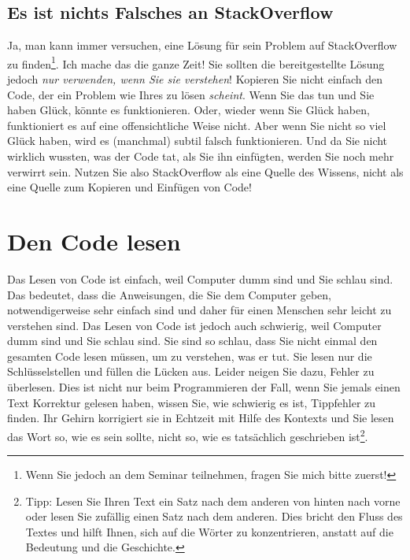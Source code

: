 \documentclass[
]{book}
\begin{document}
\hypertarget{es-ist-nichts-falsches-an-stackoverflow}{%
\subsection{Es ist nichts Falsches an StackOverflow}\label{es-ist-nichts-falsches-an-stackoverflow}}

Ja, man kann immer versuchen, eine Lösung für sein Problem auf StackOverflow zu finden\footnote{Wenn Sie jedoch an dem Seminar teilnehmen, fragen Sie mich bitte zuerst!}. Ich mache das die ganze Zeit! Sie sollten die bereitgestellte Lösung jedoch \emph{nur verwenden, wenn Sie sie verstehen}! Kopieren Sie nicht einfach den Code, der ein Problem wie Ihres zu lösen \emph{scheint}. Wenn Sie das tun und Sie haben Glück, könnte es funktionieren. Oder, wieder wenn Sie Glück haben, funktioniert es auf eine offensichtliche Weise nicht. Aber wenn Sie nicht so viel Glück haben, wird es (manchmal) subtil falsch funktionieren. Und da Sie nicht wirklich wussten, was der Code tat, als Sie ihn einfügten, werden Sie noch mehr verwirrt sein. Nutzen Sie also StackOverflow als eine Quelle des Wissens, nicht als eine Quelle zum Kopieren und Einfügen von Code!

\hypertarget{reading-tips}{%
\section{Den Code lesen}\label{reading-tips}}

Das Lesen von Code ist einfach, weil Computer dumm sind und Sie schlau sind. Das bedeutet, dass die Anweisungen, die Sie dem Computer geben, notwendigerweise sehr einfach sind und daher für einen Menschen sehr leicht zu verstehen sind. Das Lesen von Code ist jedoch auch schwierig, weil Computer dumm sind und Sie schlau sind. Sie sind so schlau, dass Sie nicht einmal den gesamten Code lesen müssen, um zu verstehen, was er tut. Sie lesen nur die Schlüsselstellen und füllen die Lücken aus. Leider neigen Sie dazu, Fehler zu überlesen. Dies ist nicht nur beim Programmieren der Fall, wenn Sie jemals einen Text Korrektur gelesen haben, wissen Sie, wie schwierig es ist, Tippfehler zu finden. Ihr Gehirn korrigiert sie in Echtzeit mit Hilfe des Kontexts und Sie lesen das Wort so, wie es sein sollte, nicht so, wie es tatsächlich geschrieben ist\footnote{Tipp: Lesen Sie Ihren Text ein Satz nach dem anderen von hinten nach vorne oder lesen Sie zufällig einen Satz nach dem anderen. Dies bricht den Fluss des Textes und hilft Ihnen, sich auf die Wörter zu konzentrieren, anstatt auf die Bedeutung und die Geschichte.}.
\end{document}
